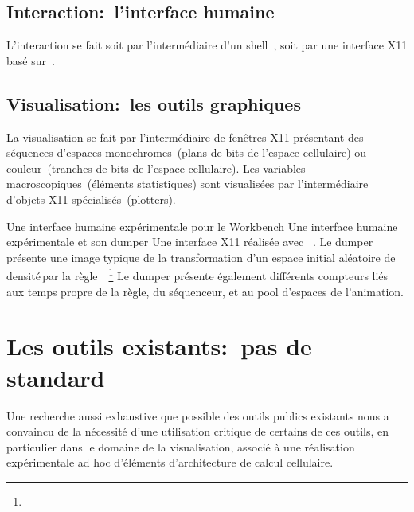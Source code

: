 \subsection*{Interaction:~l'interface humaine}

L'interaction se fait soit par l'intermédiaire d'un shell~, soit
par une interface X11 basé sur~. %

\subsection*{Visualisation:~les outils graphiques}

La visualisation se fait par l'intermédiaire de fenêtres X11
présentant des séquences d'espaces monochromes~(plans de bits de
l'espace cellulaire) ou couleur~(tranches de bits de l'espace
cellulaire). %
Les variables macroscopiques~(éléments statistiques) sont visualisées
par l'intermédiaire d'objets X11 spécialisés~(plotters). %

%
{Une interface humaine expérimentale pour le Workbench}%
{Une interface humaine expérimentale et son dumper}%
{Une interface X11 réalisée avec
  \protect{}~\cite[]{Ousterhout90,Ousterhout91}. %
  Le dumper présente une image typique de la transformation d'un espace
  initial aléatoire de densité\,\Sundemi par la
  règle~~\cite[]{Vichniac86,Toffoli87}\footnote{%
    } %
  Le dumper présente également différents compteurs liés aux temps
  propre de la règle, du séquenceur, et au pool d'espaces de l'animation. %
}

\section{Les outils existants:~pas de standard}

Une recherche aussi exhaustive que possible des outils publics
existants nous a convaincu de la nécessité d'une utilisation critique
de certains de ces outils, en particulier dans le domaine de la
visualisation, associé à une réalisation expérimentale ad hoc
d'éléments d'architecture de calcul cellulaire. %

